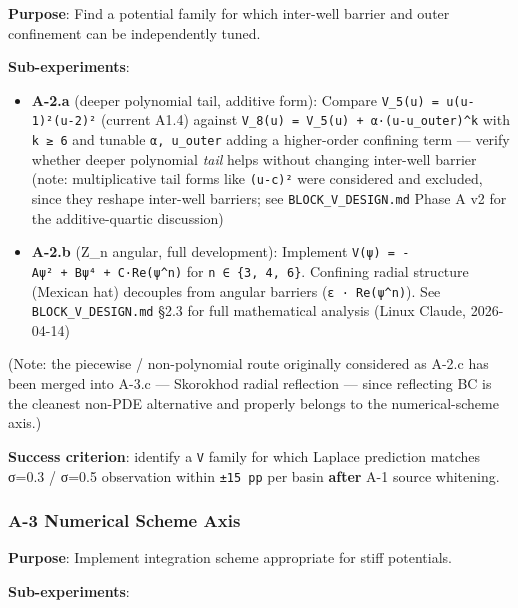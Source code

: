 \documentclass[
]{article}
\providecommand{\tightlist}{%
  \setlength{\itemsep}{0pt}\setlength{\parskip}{0pt}}
\begin{document}
\textbf{Purpose}: Find a potential family for which inter-well barrier
and outer confinement can be independently tuned.

\textbf{Sub-experiments}:

\begin{itemize}
\tightlist
\item
  \textbf{A-2.a} (deeper polynomial tail, additive form): Compare
  \texttt{V\_5(u)\ =\ u(u-1)²(u-2)²} (current A1.4) against
  \texttt{V\_8(u)\ =\ V\_5(u)\ +\ α·(u-u\_outer)\^{}k} with
  \texttt{k\ ≥\ 6} and tunable \texttt{α,\ u\_outer} adding a
  higher-order confining term --- verify whether deeper polynomial
  \emph{tail} helps without changing inter-well barrier (note:
  multiplicative tail forms like \texttt{(u-c)²} were considered and
  excluded, since they reshape inter-well barriers; see
  \texttt{BLOCK\_V\_DESIGN.md} Phase A v2 for the additive-quartic
  discussion)
\item
  \textbf{A-2.b} (Z\_n angular, full development): Implement
  \texttt{V(ψ)\ =\ -A\textbar{}ψ\textbar{}²\ +\ B\textbar{}ψ\textbar{}⁴\ +\ C·Re(ψ\^{}n)}
  for \texttt{n\ ∈\ \{3,\ 4,\ 6\}}. Confining radial structure (Mexican
  hat) decouples from angular barriers (\texttt{ε\ ·\ Re(ψ\^{}n)}). See
  \texttt{BLOCK\_V\_DESIGN.md} §2.3 for full mathematical analysis
  (Linux Claude, 2026-04-14)
\end{itemize}

(Note: the piecewise / non-polynomial route originally considered as
A-2.c has been merged into A-3.c --- Skorokhod radial reflection ---
since reflecting BC is the cleanest non-PDE alternative and properly
belongs to the numerical-scheme axis.)

\textbf{Success criterion}: identify a \texttt{V} family for which
Laplace prediction matches σ=0.3 / σ=0.5 observation within
\texttt{±15\ pp} per basin \textbf{after} A-1 source whitening.

\hypertarget{a-3-numerical-scheme-axis}{%
\subsubsection{A-3 Numerical Scheme
Axis}\label{a-3-numerical-scheme-axis}}

\textbf{Purpose}: Implement integration scheme appropriate for stiff
potentials.

\textbf{Sub-experiments}:
\end{document}

